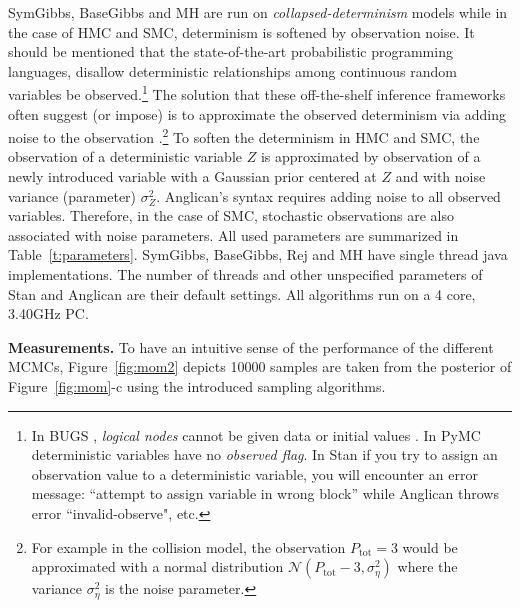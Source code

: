 \documentclass{article} %
\begin{document}
SymGibbs, BaseGibbs and MH are run on \emph{collapsed-determinism} models while in the case of HMC and SMC, determinism is softened by observation noise. %
It should be mentioned that 
the state-of-the-art probabilistic programming languages,
disallow deterministic relationships among continuous random variables 
be observed.\footnote{
In BUGS \cite{lunn2009bugs}, \emph{logical nodes} cannot be given data or initial values .
In PyMC \cite{patil2010pymc} deterministic variables have no \emph{observed flag}. 
In Stan \cite{stan-manual:2014} 
if you try to assign an observation value to a deterministic variable, you will encounter an error message: 
``attempt to assign variable in wrong block'' while 
Anglican \cite{wood2014new} throws error ``invalid-observe", etc.}
The solution that these off-the-shelf inference frameworks often suggest (or impose) is to approximate the observed determinism via adding noise to the observation 
\cite{patil2010pymc}.\footnote{
For example in the collision model, the observation $P_{\text{tot}} = 3$  would be 
approximated with a normal distribution
{\footnotesize $\mathcal{N}( P_{\text{tot}} - 3, \sigma_\eta^2)$}  
where the variance $\sigma_\eta^2$ is the noise parameter.
}
%
To soften the determinism in HMC and SMC,
the observation of a deterministic variable $Z$ %
is approximated by observation of a newly introduced variable 
with a Gaussian prior centered at $Z$ and with noise variance (parameter) $\sigma^2_{Z}$. 
Anglican's syntax requires %
adding noise to all observed variables. Therefore, in the case of SMC, stochastic observations are also associated with noise parameters.
All used parameters are summarized in Table~\ref{t:parameters}. 
SymGibbs, BaseGibbs, Rej and MH have single thread java implementations.
The number of threads and other unspecified parameters of Stan and Anglican are their default settings.   
All algorithms run on a 4 core, 3.40GHz PC.%


{\bf Measurements.}
To have an intuitive sense of the performance of the different MCMCs,
Figure~\ref{fig:mom2} depicts 10000 samples are taken from the posterior of 
Figure~\ref{fig:mom}-c using the introduced sampling algorithms. 
\end{document}
